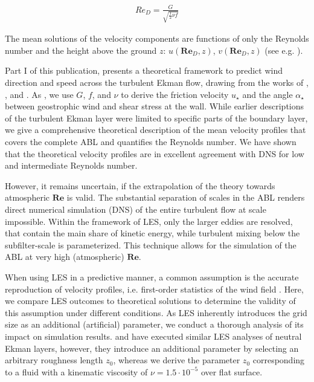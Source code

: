 \documentclass[a4paper,11pt]{article}
\newcommand{\RE}{\mathbf{Re}}
\begin{document}
\begin{align}\label{red}
 Re_D = \frac{G}{\sqrt{\frac{1}{2}\nu f}}
\end{align}

The mean solutions of the velocity components are functions of only the Reynolds number and the height above the ground $z$: $u(\RE_D,z)$, $v(\RE_D,z)$ (see e.g. \cite{csanady1967resistance}).

Part I of this publication, presents a theoretical framework to predict wind direction and speed across the turbulent Ekman flow, drawing from the works of \cite{csanady1967resistance}, \cite{tennekes1973logarithmic}, and \cite{spalart1989theoretical}. As \cite{spalart1989theoretical}, we use $G$, $f$, and $\nu$ to derive the friction velocity $u_\star$ and the angle $\alpha_\star$ between geostrophic wind and shear stress at the wall. While earlier descriptions of the turbulent Ekman layer were limited to specific parts of the boundary layer, we give a comprehensive theoretical description of the mean velocity profiles that covers the complete ABL and quantifies the Reynolds number. We have shown that the theoretical velocity profiles are in excellent agreement with DNS for low and intermediate Reynolds number. 

However, it remains uncertain, if the extrapolation of the theory towards atmospheric $\RE$ is valid. The substantial separation of scales in the ABL renders direct numerical simulation (DNS) of the entire turbulent flow at scale impossible. Within the framework of LES, only the larger eddies are resolved, that contain the main share of kinetic energy, while turbulent mixing below the subfilter-scale is parameterized. This technique allows for the simulation of the ABL at very high (atmospheric) $\RE$. 

When using LES in a predictive manner, a common assumption is the accurate reproduction of velocity profiles, i.e. first-order statistics of the wind field \citep{fedorovich2004convective}. Here, we compare LES outcomes to theoretical solutions to determine the validity of this assumption under different conditions. As LES inherently introduces the grid size as an additional (artificial) parameter, we conduct a thorough analysis of its impact on simulation results. \cite{esau2004simulation} and \cite{jiang2018large} have executed similar LES analyses of neutral Ekman layers, however, they introduce an additional parameter by selecting an arbitrary roughness length $z_0$, whereas we derive the parameter $z_0$ corresponding to a fluid with a kinematic viscosity of $\nu = 1.5\cdot10^{-5}$ over flat surface.
\end{document}
